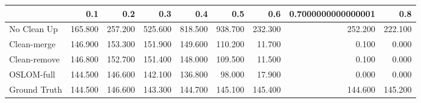 \begin{tabular}{lrrrrrrrr}
\toprule
{} &     0.1 &     0.2 &     0.3 &     0.4 &     0.5 &     0.6 & 0.7000000000000001 &     0.8 \\
\midrule
No Clean Up  & 165.800 & 257.200 & 525.600 & 818.500 & 938.700 & 232.300 &            252.200 & 222.100 \\
Clean-merge  & 146.900 & 153.300 & 151.900 & 149.600 & 110.200 &  11.700 &              0.100 &   0.000 \\
Clean-remove & 146.800 & 152.700 & 151.400 & 148.000 & 109.500 &  11.500 &              0.100 &   0.000 \\
OSLOM-full   & 144.500 & 146.600 & 142.100 & 136.800 &  98.000 &  17.900 &              0.000 &   0.000 \\
Ground Truth & 144.500 & 146.600 & 143.300 & 144.700 & 145.100 & 145.400 &            144.600 & 145.200 \\
\bottomrule
\end{tabular}
